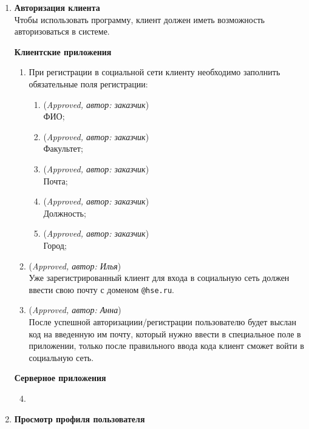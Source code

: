 \begin{enumerate}
	\item \textbf{Авторизация клиента\\}
	Чтобы использовать программу, клиент должен иметь возможность авторизоваться в системе.
	
	\textbf{Клиентские приложения}
	\begin{enumerate}
		\item При регистрации в социальной сети клиенту необходимо заполнить обязательные поля регистрации: \label{FR-1.2}
		\begin{enumerate}
			\item (\textit{Approved, автор: заказчик}) \\ФИО;
			\item (\textit{Approved, автор: заказчик}) \\Факультет;
			\item (\textit{Approved, автор: заказчик})\\Почта;
			\item (\textit{Approved, автор: заказчик})\\Должность; 
			\item (\textit{Approved, автор: заказчик})\\Город; 
		\end{enumerate}
		\item (\textit{Approved, автор: Илья})\\Уже зарегистрированный клиент для входа в социальную сеть должен ввести свою почту с доменом \verb+@hse.ru+.
		\item (\textit{Approved, автор: Анна})\\
		После успешной авторизациии/регистрации пользователю будет выслан код на введенную им почту, который нужно ввести в специальное поле в приложении, только после правильного ввода кода клиент сможет войти в социальную сеть.
	\end{enumerate}
	\textbf{Серверное приложения}
	\begin{enumerate}
		\setcounter{enumii}{3}
		\item {\color{red}{TODO взять у Ильи}}
	\end{enumerate}
	\item \textbf{Просмотр профиля пользователя}
	

\end{enumerate}
